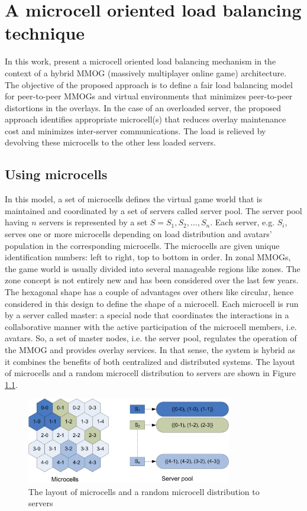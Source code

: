 \chapter{A microcell oriented load balancing technique}

In this work, \cite{ahmed2008mol} present a microcell oriented load balancing mechanism in the context of a hybrid MMOG (massively multiplayer online game) architecture. The objective of the proposed approach is to define a fair load balancing model for peer-to-peer MMOGs and virtual environments that minimizes peer-to-peer distortions in the overlays. In the case of an overloaded server, the proposed approach identifies appropriate microcell(s) that reduces overlay maintenance cost and minimizes inter-server communications. The load is relieved by devolving these microcells to the other less loaded servers.



\section{Using microcells}

In this model, a set of microcells defines the virtual game world that is maintained and coordinated by a set of servers called server pool. The server pool having $n$ servers is represented by a set $S = {S_1, S_2, ..., S_n}$. Each server, e.g. $S_i$, serves one or more microcells depending on load distribution and avatars' population in the corresponding microcells. The microcells are given unique identification numbers: left to right, top to bottom in order. In zonal MMOGs, the game world is usually divided into several manageable regions like zones. The zone concept is not entirely new and has been considered over the last few years. The hexagonal shape has a couple of advantages over others like circular, hence considered in this design to define the shape of a microcell. Each microcell is run by a server called master: a special node that coordinates the interactions in a collaborative manner with the active participation of the microcell members, i.e. avatars. So, a set of master nodes, i.e. the server pool, regulates the operation of the MMOG and provides overlay services. In that sense, the system is hybrid as it combines the benefits of both centralized and distributed systems. The layout of microcells and a random microcell distribution to servers are shown in Figure \ref{fig:ahmedmicro}.

\begin{figure}
 \centering
 \includegraphics[width=0.8\textwidth]{images/ahmedmicro}
 \caption{The layout of microcells and a random microcell distribution to servers}
 \label{fig:ahmedmicro}
\end{figure}



